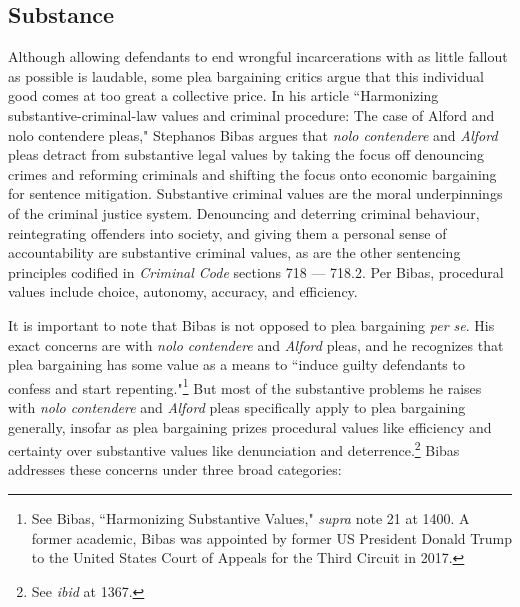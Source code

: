 \subsection{Substance}

Although allowing defendants to end wrongful incarcerations with as little fallout as possible is laudable, some plea bargaining critics argue that this individual good comes at too great a collective price. In his article ``Harmonizing substantive-criminal-law values and criminal procedure: The case of Alford and nolo contendere pleas," Stephanos Bibas argues that \textit{nolo contendere} and \textit{Alford} pleas detract from substantive legal values by taking the focus off denouncing crimes and reforming criminals and shifting the focus onto economic bargaining for sentence mitigation. Substantive criminal values are the moral underpinnings of the criminal justice system. Denouncing and deterring criminal behaviour, reintegrating offenders into society, and giving them a personal sense of accountability are substantive criminal values, as are the other sentencing principles codified in \textit{Criminal Code} sections 718 — 718.2. Per Bibas, procedural values include choice, autonomy, accuracy, and efficiency.

It is important to note that Bibas is not opposed to plea bargaining \textit{per se}. His exact concerns are with \textit{nolo contendere} and \textit{Alford} pleas, and he recognizes that plea bargaining has some value as a means to ``induce guilty defendants to confess and start repenting."\footnote{See Bibas, ``Harmonizing Substantive Values," \textit{supra} note 21 at 1400. A former academic, Bibas was appointed by former US President Donald Trump to the United States Court of Appeals for the Third Circuit in 2017.} But most of the substantive problems he raises with \textit{nolo contendere} and \textit{Alford} pleas specifically apply to plea bargaining generally, insofar as plea bargaining prizes procedural values like efficiency and certainty over substantive values like denunciation and deterrence.\footnote{See \textit{ibid} at 1367.} Bibas addresses these concerns under three broad categories:

